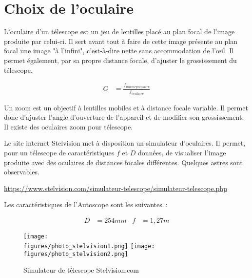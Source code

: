 \section{Choix de l'oculaire}

L'oculaire d'un télescope est un jeu de lentilles placé au plan focal de l'image produite par celui-ci. Il sert avant tout à faire de cette image présente au plan focal une image "à l'infini", c'est-à-dire nette sans accommodation de l'œil. Il permet également, par sa propre distance focale, d'ajuster le grossissement du télescope.

\begin{align*}
G&=\frac{f_{miroir primaire}}{f_{oculaire}}
\end{align*}

\vspace{1cm}

Un zoom est un objectif à lentilles mobiles et à distance focale variable. Il permet donc d'ajuster l'angle d'ouverture de l'appareil et de modifier son grossissement. Il existe des oculaires zoom pour télescope.

\vspace{1cm}

Le site internet Stelvision met à disposition un simulateur d'oculaires. Il permet, pour un télescope de caractéristiques $f$ et $D$ données, de visualiser l'image produite avec des oculaires de distances focales différentes. Quelques astres sont observables.

\url{https://www.stelvision.com/simulateur-telescope/simulateur-telescope.php}

\vspace{1cm}

Les caractéristiques de l'Autoscope sont les suivantes~:

\begin{align*}
D&=254mm&f&=1,27m
\end{align*}

\begin{figure}[H]
    \centering
    \texttt{[image: \\figures/photo\_stelvision1.png]}
    \texttt{[image: \\figures/photo\_stelvision2.png]}
    \decoRule
    \caption[
	Simulateur de télescope Stelvision.com]{
    Simulateur de télescope Stelvision.com}
    \label{fig:Simulateur de télescope Stelvision.com}
    \end{figure}

